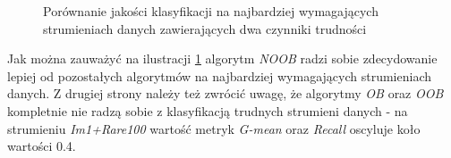 \begin{figure}[h]
    \centering
    \qquad
    \caption{Porównanie jakości klasyfikacji na najbardziej wymagających strumieniach danych zawierających dwa czynniki trudności}\label{Figure:PairsComparison}
\end{figure}

\noindent Jak można zauważyć na ilustracji \ref{Figure:PairsComparison} algorytm \textit{NOOB} radzi sobie zdecydowanie lepiej od pozostałych algorytmów na najbardziej wymagających strumieniach danych. Z drugiej strony należy też zwrócić uwagę, że algorytmy \textit{OB} oraz \textit{OOB} kompletnie nie radzą sobie z klasyfikacją trudnych strumieni danych - na strumieniu \textit{Im1+Rare100} wartość metryk \textit{G-mean} oraz \textit{Recall} oscyluje koło wartości 0.4.

